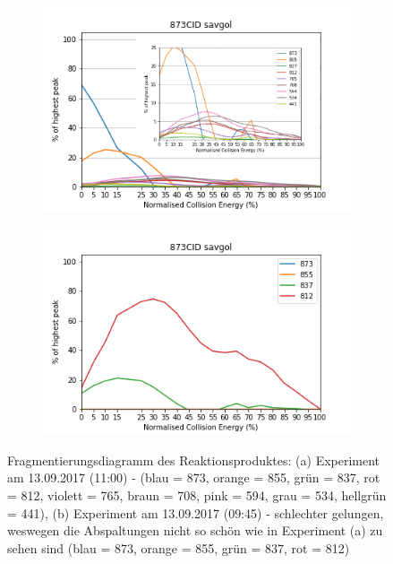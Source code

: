\begin{figure}[!htbp]
  \begin{subfigure}[b]{\textwidth}
    \centering
    \includegraphics[scale=0.9]{figures/Kapitel4/Kataboliten/diags/873CID-savgol1.png}
    \caption{}
    \label{fig:873MKLeafspraydiags1}
  \end{subfigure}
  \hfill
  \begin{subfigure}[b]{\textwidth}
    \centering
    \includegraphics[scale=0.9]{figures/Kapitel4/Kataboliten/diags/873CID-savgol2.png}
    \caption{}
    \label{fig:873MKstructurediags2}
  \end{subfigure}
  
  \caption[Fragmentierungsdiagramm des Reaktionsproduktes von Bo-NCC-1, Quelle: Autor]{Fragmentierungsdiagramm des Reaktionsproduktes: (a) Experiment am 13.09.2017 (11:00) - (blau = 873, orange = 855, grün = 837, rot = 812, violett = 765, braun = 708, pink = 594, grau = 534, hellgrün = 441), (b) Experiment am 13.09.2017 (09:45) - schlechter gelungen, weswegen die Abspaltungen nicht so schön wie in Experiment (a) zu sehen sind (blau = 873, orange = 855, grün = 837, rot = 812)}
\end{figure}